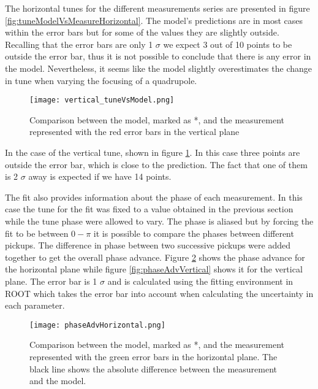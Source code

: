 The horizontal tunes for the different measurements series are presented in figure \ref{fig:tuneModelVsMeasureHorizontal}. The model's predictions are in most cases within the error bars but for some of the values they are slightly outside. Recalling that the error bars are only 1 $\sigma$ we expect 3 out of 10 points to be outside the error bar, thus it is not possible to conclude that there is any error in the model. Nevertheless, it seems like the model slightly overestimates the change in tune when varying the focusing of a quadrupole.
 
\begin{figure}[!h]
\centering
\texttt{[image: vertical\_tuneVsModel.png]}
\caption[Comparison between the tune from the model and the measurement in the vertical plane]{Comparison between the model, marked as *, and the measurement represented with the red error bars in the vertical plane \label{fig:tuneModelVsMeasureVertical}}
\end{figure}
In the case of the vertical tune, shown in figure \ref{fig:tuneModelVsMeasureVertical}. In this case three points are outside the error bar, which is close to the prediction. The fact that one of them is 2 $\sigma$ away is expected if we have 14 points.


The fit also provides information about the phase of each measurement. In this case the tune for the fit was fixed to a value obtained in the previous section while the tune phase were allowed to vary. The phase is aliased but by forcing the fit to be between $0 - \pi$ it is possible to compare the phases between different pickups. The difference in phase between two successive pickups were added together to get the overall phase advance. Figure \ref{fig:phaseAdvHorizontal} shows the phase advance for the horizontal plane while figure \ref{fig:phaseAdvVertical} shows it for the vertical plane. The error bar is 1 $\sigma$ and is calculated using the fitting environment in ROOT which takes the error bar into account when calculating the uncertainty in each parameter.
 
\begin{figure}[!h]
\centering
\texttt{[image: phaseAdvHorizontal.png]}
\caption[Phase advance in the horizontal plane]{Comparison between the model, marked as *, and the measurement represented with the green error bars in the horizontal plane. The black line shows the absolute difference between the measurement and the model. \label{fig:phaseAdvHorizontal}}
\end{figure}
 
